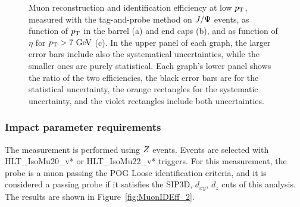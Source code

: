 \begin{figure}[tbh]
\begin{subfigure}{0.3\textwidth}
\caption{}
\end{subfigure}
    \caption{Muon reconstruction and identification efficiency at low $p_{\rm{T}}$, measured with the tag-and-probe method on $J/\Psi$ events, as function of $p_{\rm{T}}$ in the barrel (a) and end caps (b), and as function of $\eta$ for $p_{\rm{T}} > 7\ \mathrm{Ge\kern -0.1em V}$ (c). In the upper panel of each graph, the larger error bars include also the systematical uncertainties, while the smaller ones are purely statistical. Each graph's lower panel shows the ratio of the two efficiencies, the black error bars are for the statistical uncertainty, the orange rectangles for the systematic uncertainty, and the violet rectangles include both uncertainties.}
\label{fig:MuonIDEff_1}
\end{figure}


\subsubsection{Impact parameter requirements}
The measurement is performed using $Z$ events. Events are selected with HLT\_IsoMu20\_v* or HLT\_IsoMu22\_v* triggers.
For this measurement, the probe is a muon passing the POG Loose identification criteria,
and it is considered a passing probe if it satisfies the SIP3D, $d_{xy}$, $d_z$ cuts of this analysis.
The results are shown in Figure~\ref{fig:MuonIDEff_2}.


